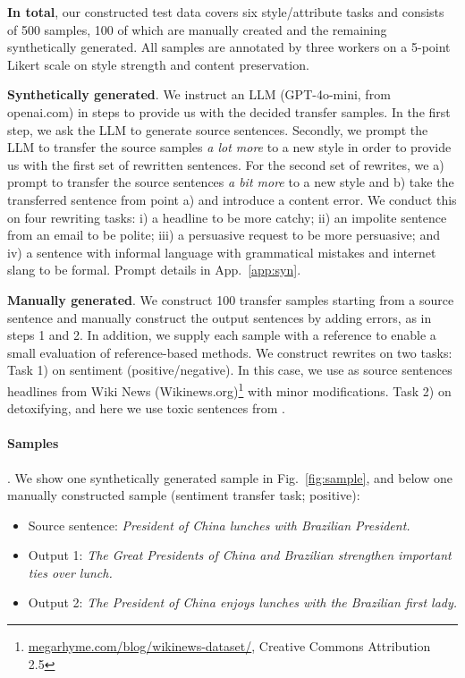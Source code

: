 \textbf{In total}, our constructed test data covers six style/attribute tasks and consists of 500 samples, 100 of which are manually created and the remaining synthetically generated. All samples are annotated by three workers on a 5-point Likert scale on style strength and content preservation. 

\textbf{Synthetically generated}. We instruct an LLM (GPT-4o-mini, from openai.com) in steps to provide us with the decided transfer samples. In the first step, we ask the LLM to generate source sentences. Secondly, we prompt the LLM to transfer the source samples \textit{a lot more} to a new style in order to provide us with the first set of rewritten sentences. For the second set of rewrites, we a) prompt to transfer the source sentences \textit{a bit more} to a new style and b) take the transferred sentence from point a) and introduce a content error. We conduct this on four rewriting tasks: i) a headline to be more catchy; ii) an impolite sentence from an email to be polite; iii) a persuasive request to be more persuasive; and iv) a sentence with informal language with grammatical mistakes and internet slang to be formal. Prompt details in App.~\ref{app:syn}.    

\textbf{Manually generated}. We construct 100 transfer samples starting from a source sentence and manually construct the output sentences by adding errors, as in steps 1 and 2. In addition, we supply each sample with a reference to enable a small evaluation of reference-based methods. We construct rewrites on two tasks: Task 1) on sentiment (positive/negative). In this case, we use as source sentences headlines from Wiki News (Wikinews.org)\footnote{\url{megarhyme.com/blog/wikinews-dataset/},  Creative Commons Attribution 2.5} with minor modifications. Task 2) on detoxifying, and here we use toxic sentences from \citet{logacheva-etal-2022-paradetox}. 


\paragraph{Samples}.
We show one synthetically generated  sample in Fig.~\ref{fig:sample}, and below one manually constructed sample (sentiment transfer task; positive):
\begin{itemize}[leftmargin=*,noitemsep,nolistsep]
    \item Source sentence: \textit{President of China lunches with Brazilian President.}
    \item Output 1: \textit{The Great Presidents of China and Brazilian strengthen important ties over lunch.}
    \item Output 2: \textit{The President of China enjoys lunches with the Brazilian first lady.}
\end{itemize}


